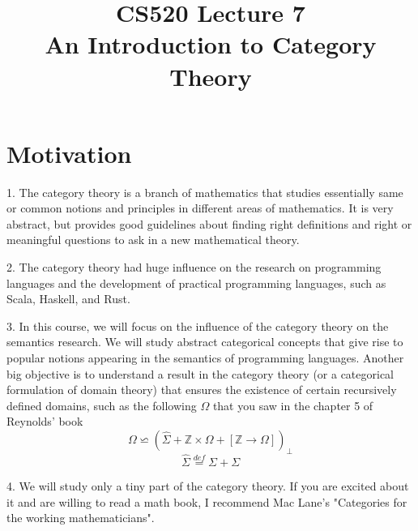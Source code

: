 \documentclass{report}[12pt]
\begin{document}
\setlength\parindent{0pt}

  {\topsep}{\topsep}%
  {\itshape}{}%
  {\bfseries}{}%
  {\newline}{}%

\theoremstyle{break}

\newtheorem{theorem}{Theorem}[section]
\newtheorem{definition}{Definition}
\newtheorem{proposition}{Proposition}
\newtheorem{corollary}{Corollary}
\newtheorem{lemma}{Lemma}
\newtheorem{example}{Example}
\newcommand{\nonterminal}[1]{\langle \text{#1}\rangle}
\newcommand{\rem}[0]{\text{ rem }}
\newcommand{\interp}[1]{\llbracket #1 \rrbracket}
\newcommand{\bbot}[0]{\Perp}
\newcommand{\TODO}[1]{TODO : #1}

\setcounter{chapter}{7}

\title{CS520 Lecture 7\\An Introduction to Category Theory}
\maketitle
\section{Motivation}
1. The category theory is a branch of mathematics that studies essentially same or common notions and principles in different areas of mathematics. It is very abstract, but provides good guidelines about finding right definitions and right or meaningful questions to ask in a new mathematical theory.

2. The category theory had huge influence on the research on programming languages and the development of practical programming languages, such as Scala, Haskell, and Rust.

3. In this course, we will focus on the influence of the category theory on the semantics research. We will study abstract categorical concepts that give rise to popular notions appearing in the semantics of programming languages. Another big objective is to understand a result in the category theory (or a categorical formulation of domain theory) that ensures the existence of certain recursively defined domains, such as the following $\Omega$ that you saw in the chapter 5 of Reynolds' book
\[\Omega \backsimeq (\hat \Sigma + \mathbb{Z} \times \Omega + [\mathbb{Z}\rightarrow \Omega])_\bot\]
\[\hat{\Sigma} \stackrel{def}{=} \Sigma + \Sigma\]

4. We will study only a tiny part of the category theory. If you are excited about it and are willing to read a math book, I recommend Mac Lane's "Categories for the working mathematicians".
\end{document}
